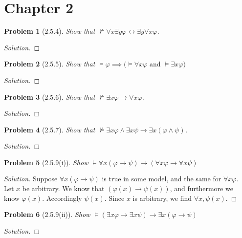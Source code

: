 \documentclass[letter]{article}
\newtheorem{problem}{Problem}
\theoremstyle{definition}
\newenvironment{solution}
{\begin{proof}[Solution]}
        {\end{proof}}
\renewcommand{\phi}{\varphi}
\begin{document}
\section{Chapter 2}
\begin{problem}[2.5.4]
    Show that $\not \models \forall x \exists y \phi \leftrightarrow \exists y \forall x \phi$.
\end{problem}
\begin{solution}
\end{solution}

\begin{problem}[2.5.5]
    Show that $\models \phi \implies \big(\models \forall x \phi \textrm{ and } \models \exists x \phi\big)$
\end{problem}
\begin{solution}
\end{solution}

\begin{problem}[2.5.6]
    Show that $\not \models \exists x \phi \to \forall x \phi$.
\end{problem}
\begin{solution}
\end{solution}

\begin{problem}[2.5.7]
    Show that $\not \models \exists x \phi \land \exists x \psi \to \exists x (\phi \land \psi)$.
\end{problem}
\begin{solution}
\end{solution}

\begin{problem}[2.5.9(i)]
    Show $\models \forall x(\phi \to \psi) \to (\forall x \phi \to \forall x \psi)$
\end{problem}
\begin{solution}
    Suppose $\forall x(\phi \to \psi)$ is true in some model, and the same for $\forall x \phi$. Let $x$ be arbitrary. We know that $(\phi(x) \to \psi(x))$, and furthermore we know $\phi(x)$. Accordingly $\psi(x)$. Since $x$ is arbitrary, we find $\forall x, \psi(x)$.
\end{solution}

\begin{problem}[2.5.9(ii)]
    Show $\models (\exists x \phi \to \exists x \psi) \to \exists x (\phi \to \psi)$
\end{problem}
\begin{solution}
\end{solution}
\end{document}
